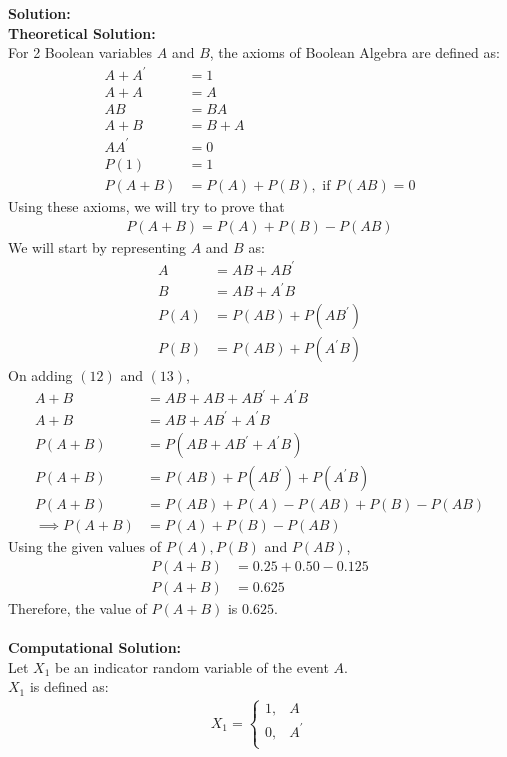 \documentclass[journal]{IEEEtran}
\begin{document}
\textbf{Solution: }\\
\textbf{Theoretical Solution:\\}
For 2 Boolean variables $A$ and $B$, the axioms of Boolean Algebra are defined as:
\begin{align}
    A + A^\prime &= 1\\
    A + A &= A\\
    AB &= BA\\
    A + B &= B + A\\
    AA^\prime &= 0\\
    P(1) &= 1\\
    P(A + B) &= P(A) + P(B), \text{ if } P(AB) = 0
\end{align}
Using these axioms, we will try to prove that
\begin{align}
    P(A + B) = P(A) + P(B) - P(AB)
\end{align}
We will start by representing $A$ and $B$ as:
\begin{align}
    A &= AB + AB^\prime\\
    B &= AB + A^\prime B\\
    P(A) &= P(AB) + P(AB^\prime)\\
    P(B) &= P(AB) + P(A^\prime B)
\end{align}
On adding \((12)\) and \((13)\),
\begin{align}
    A + B &= AB + AB + AB^\prime + A^\prime B\\
    A + B &= AB + AB^\prime + A^\prime B\\
    P(A + B) &= P(AB + AB^\prime + A^\prime B)\\
    P(A + B) &= P(AB) + P(AB^\prime) + P(A^\prime B)\\
    P(A + B) &= P(AB) + P(A) - P(AB) + P(B) - P(AB)\\
    \implies P(A + B) &= P(A) + P(B) - P(AB)
\end{align}
Using the given values of \(P(A), P(B)\) and \(P(AB)\),
\begin{align}
    P(A + B) &= 0.25 + 0.50 - 0.125\\
    P(A + B) &= 0.625
\end{align}
Therefore, the value of \(P(A + B)\) is \(0.625\). \\\\
\textbf{Computational Solution:}\\
Let \(X_1\) be an indicator random variable of the event \(A\).\\
\(X_1\) is defined as:
\begin{align}
	X_1 =
	\begin{cases}
		1 ,& A\\
		0 ,& A^\prime\\
	\end{cases}
\end{align}
\end{document}
